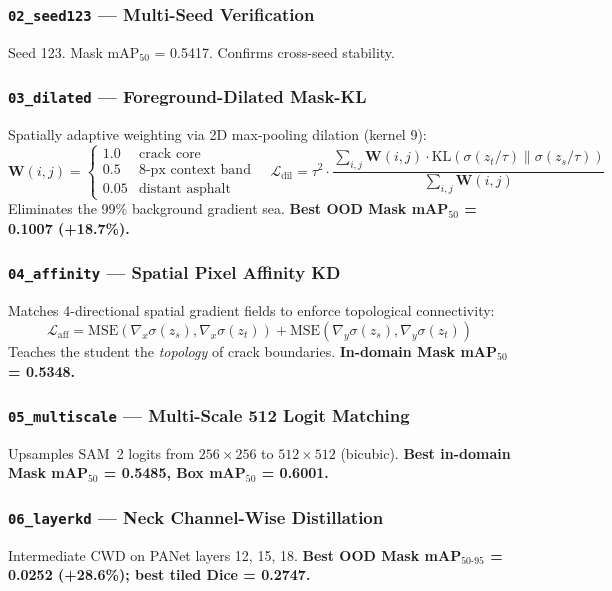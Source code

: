 \documentclass[12pt,a4paper]{article}
\begin{document}
\subsubsection{\texttt{02\_seed123} --- Multi-Seed Verification}
Seed 123. Mask mAP$_{50}$ = 0.5417. Confirms cross-seed stability.

\subsubsection{\texttt{03\_dilated} --- Foreground-Dilated Mask-KL}
\label{sec:dilated}
Spatially adaptive weighting via 2D max-pooling dilation (kernel 9):
\[
\mathbf{W}(i,j)=
\begin{cases}1.0 & \text{crack core}\\0.5 & \text{8-px context band}\\0.05 & \text{distant asphalt}\end{cases}
\quad
\mathcal{L}_\text{dil}=\tau^2\cdot\frac{\sum_{i,j}\mathbf{W}(i,j)\cdot\mathrm{KL}(\sigma(z_t/\tau)\|\sigma(z_s/\tau))}{\sum_{i,j}\mathbf{W}(i,j)}
\]
Eliminates the 99\% background gradient sea.
\textbf{Best OOD Mask mAP$_{50}$ = 0.1007 (+18.7\%).}

\subsubsection{\texttt{04\_affinity} --- Spatial Pixel Affinity KD}
\label{sec:affinity}
Matches 4-directional spatial gradient fields to enforce topological
connectivity:
\[
\mathcal{L}_\text{aff}=
  \mathrm{MSE}(\nabla_x\sigma(z_s),\nabla_x\sigma(z_t))+
  \mathrm{MSE}(\nabla_y\sigma(z_s),\nabla_y\sigma(z_t))
\]
Teaches the student the \emph{topology} of crack boundaries.
\textbf{In-domain Mask mAP$_{50}$ = 0.5348.}

\subsubsection{\texttt{05\_multiscale} --- Multi-Scale 512 Logit Matching}
Upsamples SAM~2 logits from $256\times256$ to $512\times512$ (bicubic).
\textbf{Best in-domain Mask mAP$_{50}$ = 0.5485, Box mAP$_{50}$ = 0.6001.}

\subsubsection{\texttt{06\_layerkd} --- Neck Channel-Wise Distillation}
\label{sec:layerkd_variant}
Intermediate CWD on PANet layers 12, 15, 18.
\textbf{Best OOD Mask mAP$_{50\text{-}95}$ = 0.0252 (+28.6\%); best tiled Dice = 0.2747.}
\end{document}
